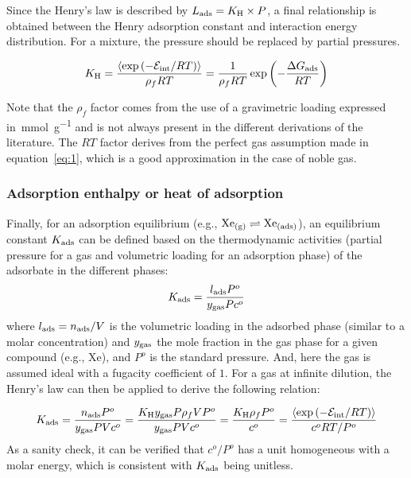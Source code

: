 \documentclass[main.tex]{subfiles}
\begin{document}
Since the Henry's law is described by $L_{\text{ads}}=K_{\text{H}} \times P$, a final relationship is obtained between the Henry adsorption constant and interaction energy distribution. For a mixture, the pressure should be replaced by partial pressures.

\begin{equation}\label{eq:henry}
    K_{\text{H}} = \dfrac{\langle \exp\left(-\mathcal{E}_{\text{int}}/RT\right) \rangle}{\rho_f RT} = \dfrac{1}{\rho_f RT} \exp\left(-\dfrac{\Delta G_{\text{ads}}}{RT}\right)
\end{equation}

Note that the $\rho_f$ factor comes from the use of a gravimetric loading expressed in~\si{\milli\mole\per\gram} and is not always present in the different derivations of the literature.\autocite{PoreBlazer} The $RT$ factor derives from the perfect gas assumption made in equation~\ref{eq:1}, which is a good approximation in the case of noble gas. 


\subsubsection{Adsorption enthalpy or heat of adsorption}

Finally, for an adsorption equilibrium (e.g., $\text{Xe}_{\text{(g)}} \rightleftharpoons \text{Xe}_{\text{(ads)}}$), an equilibrium constant $K_{\text{ads}}$ can be defined based on the thermodynamic activities (partial pressure for a gas and volumetric loading for an adsorption phase) of the adsorbate in the different phases:
\begin{equation}
  K_{\text{ads}} = \dfrac{l_{\text{ads}}P^o}{y_{\text{gas}}Pc^o}
\end{equation}
where $l_{\text{ads}}=n_{\text{ads}}/V$ is the volumetric loading in the adsorbed phase (similar to a molar concentration) and $y_{\text{gas}}$ the mole fraction in the gas phase for a given compound (e.g., Xe), and $P^o$ is the standard pressure. And, here the gas is assumed ideal with a fugacity coefficient of $1$. For a gas at infinite dilution, the Henry's law can then be applied to derive the following relation:

\begin{equation}\label{eq:eq_cst}
  K_{\text{ads}} = \dfrac{n_{\text{ads}}P^o}{y_{\text{gas}}PVc^o} = \dfrac{K_{\text{H}}y_{\text{gas}}P\rho_f V P^o}{y_{\text{gas}}PVc^o} = \dfrac{K_{\text{H}}\rho_f P^o}{c^o} = \dfrac{\langle \exp\left(-\mathcal{E}_{\text{int}}/RT\right) \rangle}{c^o RT/P^o}
\end{equation}
As a sanity check, it can be verified that $c^o/P^o$ has a unit homogeneous with a molar energy, which is consistent with $K_{\text{ads}}$ being unitless.
\end{document}
